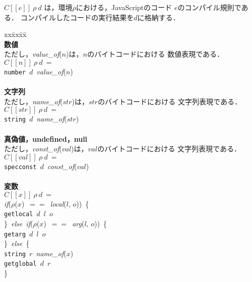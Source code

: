 \documentclass[a4j,12pt]{jarticle}
\begin{document}
$C[[e]]\ \rho\ d $ は，環境$\rho$における，JavaScriptのコード
$e$のコンパイル規則である．
コンパイルしたコードの実行結果を$d$に格納する．
\footnotesize{
\begin{tabbing}
xx\=xx\=xx\=\kill \\
\textbf{数値} \\
ただし，\textit{value\_of}($n$)は，$n$のバイトコードにおける
数値表現である．\\
\>$ C[[n]]\ \rho\ d\ = $ \\
\>\>\texttt{number}\  $d$\  \textit{value\_of}($n$) \\
\\
\textbf{文字列} \\
ただし，\textit{name\_of}($str$)は，$str$のバイトコードにおける
文字列表現である．\\
\>$ C[[str]]\ \rho\ d\ = $ \\
\>\>\texttt{string}\ $d$\ \textit{name\_of}($str$) \\
\\
\textbf{真偽値，undefined，null} \\
ただし，\textit{const\_of}($val$)は，$val$のバイトコードにおける
文字列表現である．\\
\>$ C[[val]]\ \rho\ d\ =$ \\
\>\>\texttt{specconst}\ $d$\ \textit{const\_of}($val$) \\
\\

\textbf{変数} \\
\>$C[[x]]\ \rho\ d\ =$ \\
\>\>\textit{if}($\rho$($x$)\ $==$\ \textit{local}($l$, $o$))\ \{ \\
\>\>\>\texttt{getlocal}\ $d$\ $l$\ $o$ \\
\>\>\}\ \textit{else\ if}($\rho$($x$)\ $==$\ \textit{arg}($l$, $o$))\ \{ \\
\>\>\>\texttt{getarg}\ $d$\ $l$\ $o$ \\
\>\>\}\ \textit{else}\ \{ \\
\>\>\>\texttt{string}\ $r$\ \textit{name\_of}($x$) \\
\>\>\>\texttt{getglobal}\ $d$\ $r$ \\
\>\>\} \\
\\


\end{tabbing}}
\end{document}
